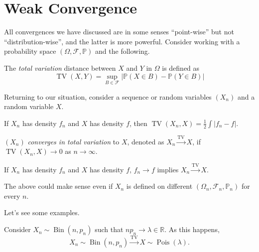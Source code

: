 \section{Weak Convergence}
All convergences we have discussed are in some senses ``point-wise'' but not ``distribution-wise'', and the latter is more powerful. Consider working with a probability space \((\Omega , \mathscr{F} , \mathbb{P} )\) and the following.

\begin{definition}\label{def:total-variation}
	The \emph{total variation} distance between \(X\) and \(Y\) in \(\Omega \) is defined as
	\[
		\operatorname{TV}(X, Y) = \sup_{B \in \mathscr{F} } \left\vert \mathbb{P} (X \in B) - \mathbb{P} (Y \in B) \right\vert
	\]
\end{definition}

Returning to our situation, consider a sequence or random variables \((X_n)\) and a random variable \(X\).

\begin{remark}
	If \(X_n\) has density \(f_n\) and \(X\) has density \(f\), then \(\operatorname{TV}(X_n, X) = \frac{1}{2} \int \vert f_n - f \vert \).
\end{remark}

\begin{definition}\label{def:convergence-in-total-variation}
	\((X_n)\) \emph{converges in total variation} to \(X\), denoted as \(X_n \overset{\operatorname{TV}}{\to } X\), if \(\operatorname{TV}(X_n, X) \to 0\) as \(n \to \infty \).
\end{definition}

\begin{remark}
	If \(X_n\) has density \(f_n\) and \(X\) has density \(f\), \(f_n \to f\) implies \(X_n \overset{\operatorname{TV} }{\to } X\).
\end{remark}

\begin{note}
	The above could make sense even if \(X_n\) is defined on different \((\Omega _n , \mathscr{F} _n, \mathbb{P} _n)\) for every \(n\).
\end{note}

Let's see some examples.

\begin{eg}
	Consider \(X_n \sim \operatorname{Bin}(n, p_n) \) such that \(n p_n \to \lambda \in \mathbb{R} \). As this happens,
	\[
		X_n \sim \operatorname{Bin}(n, p_n)
		\overset{\operatorname{TV} }{\to } X \sim \operatorname{Pois}(\lambda ).
	\]
\end{eg}

